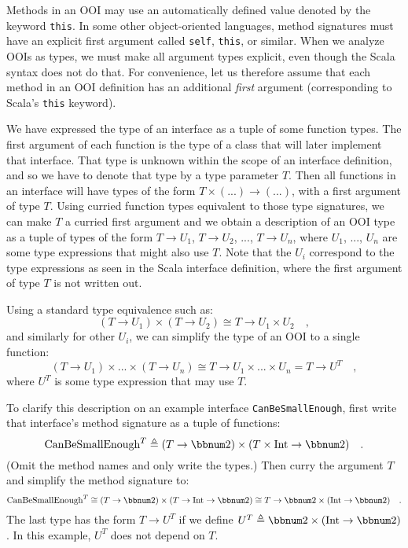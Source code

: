 Methods in an OOI may use an automatically defined value denoted by
the keyword \lstinline!this!. In some other object-oriented languages,
method signatures must have an explicit first argument called \lstinline!self!,
\lstinline!this!, or similar. When we analyze OOIs as types, we must
make all argument types explicit, even though the Scala syntax does
not do that. For convenience, let us therefore assume that each method
in an OOI definition has an additional \emph{first} argument (corresponding
to Scala\textsf{'}s \lstinline!this! keyword).

We have expressed the type of an interface as a tuple of some function
types. The first argument of each function is the type of a class
that will later implement that interface. That type is unknown within
the scope of an interface definition, and so we have to denote that
type by a type parameter $T$. Then all functions in an interface
will have types of the form $T\times(...)\rightarrow(...)$, with
a first argument of type $T$. Using curried function types equivalent
to those type signatures, we can make $T$ a curried first argument
and we obtain a description of an OOI type as a tuple of types of
the form $T\rightarrow U_{1}$, $T\rightarrow U_{2}$, ..., $T\rightarrow U_{n}$,
where $U_{1}$, ..., $U_{n}$ are some type expressions that might
also use $T$. Note that the $U_{i}$ correspond to the type expressions
as seen in the Scala interface definition, where the first argument
of type $T$ is not written out.

Using a standard type equivalence such as:
\[
(T\rightarrow U_{1})\times(T\rightarrow U_{2})\cong T\rightarrow U_{1}\times U_{2}\quad,
\]
and similarly for other $U_{i}$, we can simplify the type of an OOI
to a single function:
\[
(T\rightarrow U_{1})\times...\times(T\rightarrow U_{n})\cong T\rightarrow U_{1}\times...\times U_{n}=T\rightarrow U^{T}\quad,
\]
where $U^{T}$ is some type expression that may use $T$. 

To clarify this description on an example interface \lstinline!CanBeSmallEnough!,
first write that interface\textsf{'}s method signature as a tuple of functions:
\[
\text{CanBeSmallEnough}^{T}\triangleq(T\rightarrow\bbnum 2)\times(T\times\text{Int}\rightarrow\bbnum 2)\quad.
\]
(Omit the method names and only write the types.) Then curry the argument
$T$ and simplify the method signature to:
\[
\text{CanBeSmallEnough}^{T}\cong(T\rightarrow\bbnum 2)\times(T\rightarrow\text{Int}\rightarrow\bbnum 2)\cong T\rightarrow\bbnum 2\times(\text{Int}\rightarrow\bbnum 2)\quad.
\]
The last type has the form $T\rightarrow U^{T}$ if we define $U^{T}\triangleq\bbnum 2\times(\text{Int}\rightarrow\bbnum 2)$.
In this example, $U^{T}$ does not depend on $T$.

